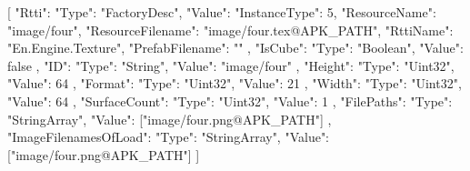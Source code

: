 [{
        "Rtti": {
            "Type": "FactoryDesc",
            "Value": {
                "InstanceType": 5,
                "ResourceName": "image/four",
                "ResourceFilename": "image/four.tex@APK_PATH",
                "RttiName": "En.Engine.Texture",
                "PrefabFilename": ""
            }
        },
        "IsCube": {
            "Type": "Boolean",
            "Value": false
        },
        "ID": {
            "Type": "String",
            "Value": "image/four"
        },
        "Height": {
            "Type": "Uint32",
            "Value": 64
        },
        "Format": {
            "Type": "Uint32",
            "Value": 21
        },
        "Width": {
            "Type": "Uint32",
            "Value": 64
        },
        "SurfaceCount": {
            "Type": "Uint32",
            "Value": 1
        },
        "FilePaths": {
            "Type": "StringArray",
            "Value": ["image/four.png@APK_PATH"]
        },
        "ImageFilenamesOfLoad": {
            "Type": "StringArray",
            "Value": ["image/four.png@APK_PATH"]
        }
    }]
